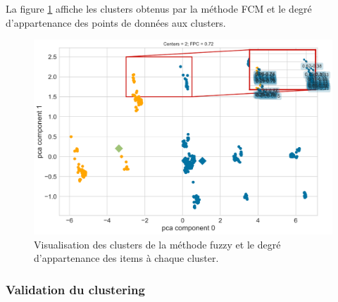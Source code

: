 \noindent La figure \ref{fuzzy_partition_plot} affiche les clusters obtenus par la méthode FCM et le degré d’appartenance des points de données aux clusters.

\begin{figure}[H]
	\begin{center}
		\includegraphics[width=\textwidth]{images/chapitre7/fuzzy_partition_plot1.png}
	\end{center}
	\caption{Visualisation des clusters de la méthode fuzzy et le degré d’appartenance des items à chaque cluster.}
	\label{fuzzy_partition_plot}
\end{figure}


\subsubsection{Validation du clustering}



